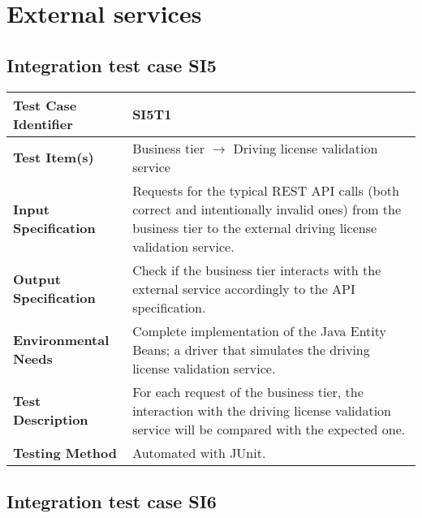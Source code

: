 \section{External services}
\subsection{Integration test case SI5}

\begin{tabular}{l p{}}
    \hline
    \textbf{Test Case Identifier} & SI5T1\\
    \hline
    \textbf{Test Item(s)} & Business tier $\rightarrow$ Driving license validation service\\
    \hline
    \textbf{Input Specification} & Requests for the typical REST API calls (both correct and intentionally invalid ones) from the business tier to the external driving license validation service.\\
    \hline
    \textbf{Output Specification} & Check if the business tier interacts with the external service accordingly to the API specification.\\
    \hline
    \textbf{Environmental Needs} & Complete implementation of the Java Entity Beans; a driver that simulates the driving license validation service. \\
    \hline
    \textbf{Test Description} & For each request of the business tier, the interaction with the driving license validation service will be compared with the expected one.\\
    \hline
    \textbf{Testing Method} & Automated with JUnit.\\
    \hline
\end{tabular}

\vspace{2em}

\subsection{Integration test case SI6}
\label{sec:performance-business}

